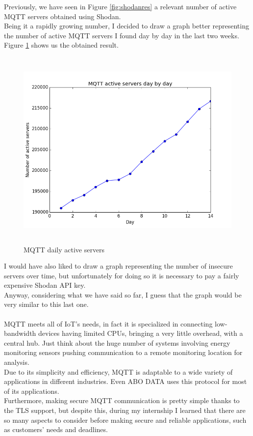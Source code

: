 \documentclass[12pt]{report}
\begin{document}
Previously, we have seen in Figure \ref{fig:shodanres} a relevant number of active MQTT servers obtained using Shodan.\\
Being it a rapidly growing number, I decided to draw a graph better representing the number of active MQTT servers I found day by day in the last two weeks.\\
Figure \ref{fig:activeserversgraph} shows us the obtained result.

\begin{figure}[H]
\includegraphics[width=12cm,height=10cm,keepaspectratio]{conteggio_servers_grafico}
\centering
\caption{MQTT daily active servers}
\label{fig:activeserversgraph}
\end{figure}

I would have also liked to draw a graph representing the number of insecure servers over time, but unfortunately for doing so it is necessary to pay a fairly expensive Shodan API key.\\
Anyway, considering what we have said so far, I guess that the graph would be very similar to this last one.\\\\

MQTT meets all of IoT's needs, in fact it is specialized in connecting low-bandwidth devices having limited CPUs, bringing a very little overhead, with a central hub. Just think about the huge number of systems involving energy monitoring sensors pushing communication to a remote monitoring location for analysis.\\

Due to its simplicity and efficiency, MQTT is adaptable to a wide variety of applications in different industries. Even ABO DATA uses this protocol for most of its applications.\\
Furthermore, making secure MQTT communication is pretty simple thanks to the TLS support, but despite this, during my internship I learned that there are so many aspects to consider before making secure and reliable applications, such as customers' needs and deadlines.\\
\end{document}
